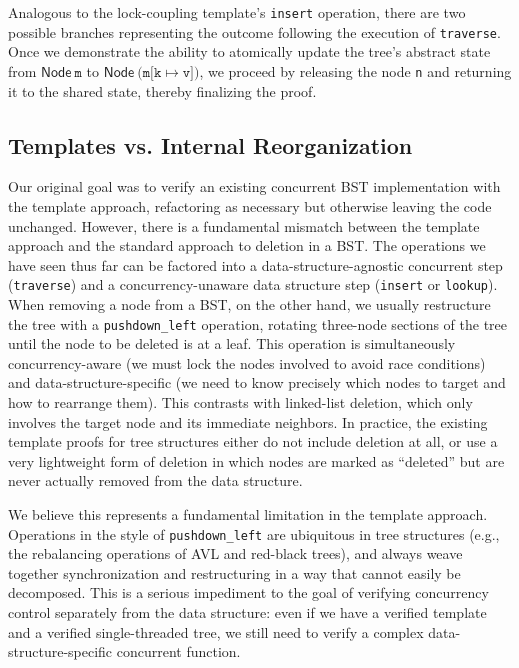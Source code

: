 \documentclass[a4paper,UKenglish,cleveref, autoref, thm-restate]{lipics-v2021}
\newcommand{\treerep}{\ensuremath{\mathsf{Node}}}
\begin{document}
Analogous to the lock-coupling template's \texttt{insert} operation, there are two possible branches representing the outcome following the execution of \texttt{traverse}. Once we demonstrate the ability to atomically update the tree's abstract state from $\treerep \ \texttt{m}$ to $\treerep\ (\texttt{m[k} \mapsto \texttt{v])}$, we proceed by releasing the node \texttt{n} and returning it to the shared state, thereby finalizing the proof.


\subsection{Templates vs. Internal Reorganization}
\label{internal_reorganize}
Our original goal was to verify an existing concurrent BST implementation with the template approach, refactoring as necessary but otherwise leaving the code unchanged. However, there is a fundamental mismatch between the template approach and the standard approach to deletion in a BST. The operations we have seen thus far can be factored into a data-structure-agnostic concurrent step (\lstinline{traverse}) and a concurrency-unaware data structure step (\lstinline{insert} or \lstinline{lookup}). When removing a node from a BST, on the other hand, we usually restructure the tree with a \lstinline{pushdown_left} operation, %
rotating three-node sections of the tree until the node to be deleted is at a leaf. This operation is simultaneously concurrency-aware (we must lock the nodes involved to avoid race conditions) and data-structure-specific (we need to know precisely which nodes to target and how to rearrange them). This contrasts with linked-list deletion, which only involves the target node and its immediate neighbors. In practice, the existing template proofs for tree structures either do not include deletion at all, or use a very lightweight form of deletion in which nodes are marked as ``deleted'' but are never actually removed from the data structure.

We believe this represents a fundamental limitation in the template approach. Operations in the style of \lstinline{pushdown_left} are ubiquitous in tree structures (e.g., the rebalancing operations of AVL and red-black trees), and always weave together synchronization and restructuring in a way that cannot easily be decomposed. This is a serious impediment to the goal of verifying concurrency control separately from the data structure: even if we have a verified template and a verified single-threaded tree, we still need to verify a complex data-structure-specific concurrent function. %
\end{document}
